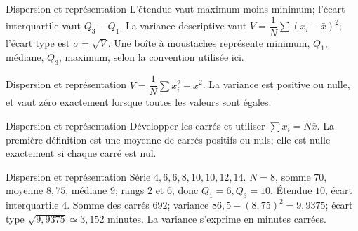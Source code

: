 \documentclass[aspectratio=169,10pt]{beamer}
\begin{document}
\begin{frame}{Dispersion et représentation}
L’étendue vaut maximum moins minimum; l’écart interquartile vaut \(Q_3-Q_1\). La variance descriptive vaut \(V=\dfrac1N\sum(x_i-\bar x)^2\); l’écart type est \(\sigma=\sqrt V\). Une boîte à moustaches représente minimum, \(Q_1\), médiane, \(Q_3\), maximum, selon la convention utilisée ici.
\end{frame}
\begin{frame}{Dispersion et représentation}
\(V=\dfrac1N\sum x_i^2-\bar x^2\). La variance est positive ou nulle, et vaut zéro exactement lorsque toutes les valeurs sont égales.
\end{frame}
\begin{frame}{Dispersion et représentation}
Développer les carrés et utiliser \(\sum x_i=N\bar x\). La première définition est une moyenne de carrés positifs ou nuls; elle est nulle exactement si chaque carré est nul.
\end{frame}
\begin{frame}{Dispersion et représentation}
Série \(4,6,6,8,10,10,12,14\). \(N=8\), somme \(70\), moyenne \(8{,}75\), médiane \(9\); rangs \(2\) et \(6\), donc \(Q_1=6,Q_3=10\). Étendue \(10\), écart interquartile \(4\). Somme des carrés \(692\); variance \(86{,}5-(8{,}75)^2=9{,}9375\); écart type \(\sqrt{9{,}9375}\simeq3{,}152\) minutes. La variance s’exprime en minutes carrées.
\end{frame}
\end{document}
